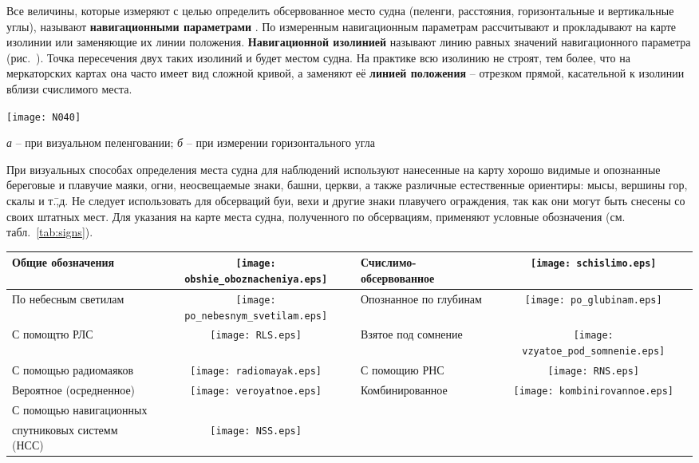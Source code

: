 Все величины, которые измеряют с целью определить обсервованное место
судна (пеленги, расстояния, горизонтальные и вертикальные углы),
называют \textbf{навигационными параметрами}
. По измеренным
навигационным параметрам рассчитывают и прокладывают на карте изолинии
или заменяющие их линии положения.
\textbf{Навигационной изолинией} 
называют линию равных значений навигационного параметра
(рис.~). Точка пересечения двух таких изолиний и будет местом
судна. На практике всю изолинию не строят, тем более, что на
меркаторских картах она часто имеет вид сложной кривой, а заменяют её
\textbf{линией положения} 
\--- отрезком прямой, касательной к изолинии вблизи счислимого места.

\begin{figure*}[htb]
  \centering{}
  \texttt{[image: N040]}
  \caption{Изолинии}
  \label{fig:N40}
  \small
  \centering{}
  \textit{а} \--- при визуальном пеленговании; \textit{б} \--- при измерении горизонтального угла
\end{figure*}

При визуальных способах определения места судна для наблюдений
используют нанесенные на карту хорошо видимые и опознанные береговые и
плавучие маяки, огни, неосвещаемые знаки, башни, церкви, а также
различные естественные ориентиры: мысы, вершины гор, скалы и
т.\=,д. Не следует использовать для обсерваций буи, вехи и другие
знаки плавучего ограждения, так как они могут быть снесены со своих
штатных мест. Для указания на карте места судна, полученного по
обсервациям, применяют условные обозначения
(см. табл.~\ref{tab:signs}).

\begin{table*}[htb]
  \centering{}
  \begin{tabular}[c]{l|c||l|c}
    \toprule
    Общие обозначения & \texttt{[image: obshie\_oboznacheniya.eps]} & 
    Счислимо-обсервованное & \texttt{[image: schislimo.eps]} \\
    \midrule
    По небесным светилам & \texttt{[image: po\_nebesnym\_svetilam.eps]} & 
    Опознанное по глубинам & \texttt{[image: po\_glubinam.eps]} \\
    \midrule
    С помощтю РЛС & \texttt{[image: RLS.eps]} & 
    Взятое под сомнение & \texttt{[image: vzyatoe\_pod\_somnenie.eps]} \\
    \midrule
    С помощью радиомаяков & \texttt{[image: radiomayak.eps]} & 
    С помощию РНС & \texttt{[image: RNS.eps]} \\
    \midrule
    Вероятное (осредненное) & \texttt{[image: veroyatnoe.eps]} & 
    Комбинированное & \texttt{[image: kombinirovannoe.eps]}\\
    \midrule
    С помощью навигационных & \\
    спутниковых системм (НСС) & \texttt{[image: NSS.eps]} \\
    \bottomrule
  \end{tabular}
  \caption{Условные обозначения мест, полученных при обсервации}
  \label{tab:signs}
\end{table*}

